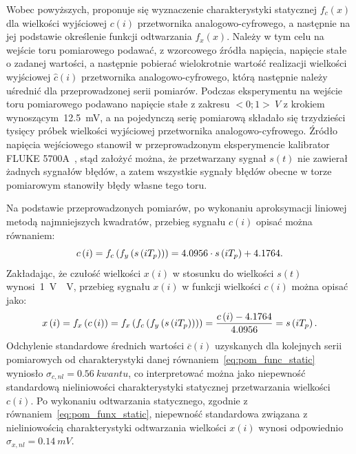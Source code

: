 Wobec powyższych, proponuje się wyznaczenie charakterystyki statycznej $f_{c}(x)$ dla wielkości wyjściowej $c(i)$ przetwornika analogowo-cyfrowego, a następnie na jej podstawie określenie funkcji odtwarzania $f_{x}(x)$. Należy w tym celu na wejście toru pomiarowego podawać, z wzorcowego źródła napięcia, napięcie stałe o zadanej wartości, a następnie pobierać wielokrotnie wartość realizacji wielkości wyjściowej $\hat{c}(i)$ przetwornika analogowo-cyfrowego, którą następnie należy uśrednić dla przeprowadzonej serii pomiarów. Podczas eksperymentu na wejście toru pomiarowego podawano napięcie stałe z zakresu $<0;1>~\unit{V}$ z krokiem wynoszącym~\qty{12.5}{mV}, a na pojedynczą serię pomiarową składało się trzydzieści tysięcy próbek wielkości wyjściowej przetwornika analogowo-cyfrowego. Źródło napięcia wejściowego stanowił w przeprowadzonym eksperymencie kalibrator FLUKE 5700A~\cite{fluke_manual}, stąd założyć można, że przetwarzany sygnał $s(t)$ nie zawierał żadnych sygnałów błędów, a zatem wszystkie sygnały błędów obecne w torze pomiarowym stanowiły błędy własne tego toru.

Na podstawie przeprowadzonych pomiarów, po wykonaniu aproksymacji liniowej metodą najmniejszych kwadratów, przebieg sygnału $c(i)$ opisać można równaniem:
\begin{equation}
c \left(i\right) = f_{c} \left(f_{y} \left(s \left(iT_{p}\right)\right)\right) = 4.0956 \cdot s \left(iT_{p}\right) + 4.1764 \label{eq:pom_func_static}.
\end{equation}
Zakładając, że czułość wielkości $x(i)$ w stosunku do wielkości $s(t)$ wynosi~\qty{1}{V \per V}, przebieg sygnału $x(i)$ w funkcji wielkości $c(i)$ można opisać jako:
\begin{equation}
x \left(i\right) = f_{x} \left(c \left(i\right)\right) = f_{x} \left(f_{c} \left(f_{y} \left(s \left(iT_{p}\right)\right)\right)\right) = \frac{c \left(i\right) - 4.1764}{4.0956} = s \left(iT_{p}\right) \label{eq:pom_funx_static}.
\end{equation}
Odchylenie standardowe średnich wartości $\overline{c}(i)$ uzyskanych dla kolejnych serii pomiarowych od charakterystyki danej równaniem~\eqref{eq:pom_func_static} wyniosło $\sigma_{c,nl} = \qty{0.56}{kwantu}$, co interpretować można jako niepewność standardową nieliniowości charakterystyki statycznej przetwarzania wielkości $c(i)$. Po wykonaniu odtwarzania statycznego, zgodnie z równaniem~\eqref{eq:pom_funx_static}, niepewność standardowa związana z nieliniowością charakterystyki odtwarzania wielkości $x(i)$ wynosi odpowiednio $\sigma_{x,nl} = \qty{0.14}{mV}$.

